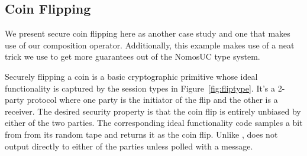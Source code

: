 %


\subsection{Coin Flipping}
We present secure coin flipping here as another case study and one that makes use of our composition operator. 
Additionally, this example makes use of a neat trick we use to get more guarantees out of the NomosUC type system.

Securely flipping a coin is a basic cryptographic primitive whose ideal functionality \Fflip is captured by the session types in Figure~\ref{fig:fliptype}.
It's a 2-party protocol where one party is the initiator of the flip and the other is a receiver.
The desired security property is that the coin flip is entirely unbiased by either of the two parties. The corresponding ideal functionality \Fflip code samples a bit from from its random tape and returns it as the coin flip.
Unlike \Fropp, \Fflip does not output directly to either of the parties unless polled with a  message.


